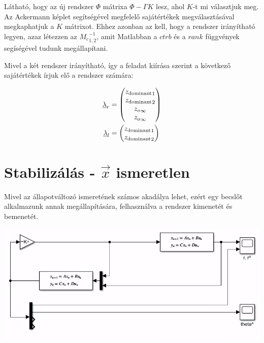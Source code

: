 \documentclass{article}
\begin{document}
    Látható, hogy az új rendszer $\Phi$ mátrixa $\Phi - \Gamma K$ lesz, ahol $K$-t mi választjuk meg. Az Ackermann képlet segítségével megfelelő sajátértékek megválasztásával megkaphatjuk a $K$ mátrixot. Ehhez azonban az kell, hogy a rendszer irányítható legyen, azaz létezzen az ${M_c}_{1,2}^{-1}$, amit Matlabban a $ctrb$ és a $rank$ függvények segíségével tudunk megállapítani.    
    
    Mivel a két rendszer irányítható, így a feladat kiírása szerint a következő sajátértékek írjuk elő a rendszer számára:

    \begin{align}
		\underline{\lambda}_r & =
		\begin{pmatrix}
			{z_{\textrm{dominant}}}_1 \\
			{z_{\textrm{dominant}}}_2 \\
			{{z_o}_{\infty}} \\
			{{z_o}_{\infty}}
		\end{pmatrix} 
        \\
		\underline{\lambda}_l & =
		\begin{pmatrix}
			{z_{\textrm{dominant}}}_1 \\
			{z_{\textrm{dominant}}}_2
		\end{pmatrix} 
    \end{align}

\section{Stabilizálás - $\vec{x}$ ismeretlen}
    Mivel az állapotváltozó ismeretének számos akadálya lehet, ezért egy becslőt alkalmazunk annak megállapítására, felhasználva a rendszer kimenetét és bemenetét.

    \begin{center}
        \includegraphics[width=\linewidth]{asset/x^.png}
    \end{center}
\end{document}
